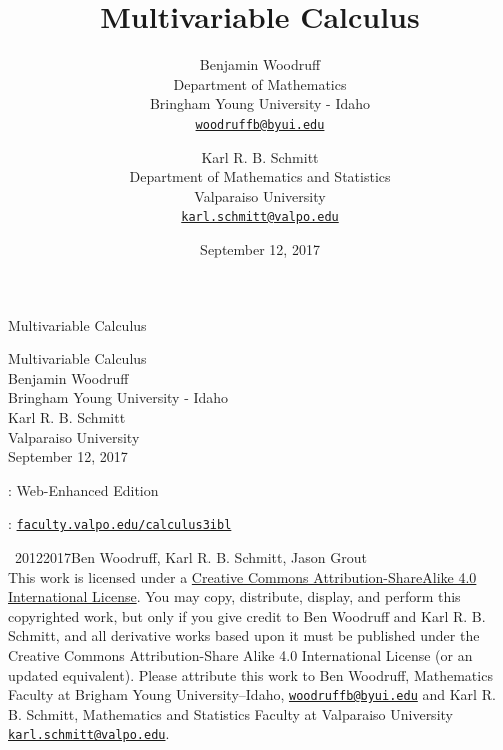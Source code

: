 \documentclass[10pt,]{book}
\title{Multivariable Calculus}
\author{Benjamin Woodruff\\
Department of Mathematics\\
Bringham Young University - Idaho\\
\href{mailto:woodruffb@byui.edu}{\nolinkurl{woodruffb@byui.edu}}
\and
Karl R. B. Schmitt\\
Department of Mathematics and Statistics \\
Valparaiso University\\
\href{mailto:karl.schmitt@valpo.edu}{\nolinkurl{karl.schmitt@valpo.edu}}
}
\date{September 12, 2017}
\theoremstyle{plain}
\theoremstyle{definition}
\theoremstyle{definition}
\theoremstyle{definition}
\theoremstyle{definition}
\theoremstyle{definition}
\numberwithin{equation}{section}
\begin{document}
\frontmatter
\thispagestyle{empty}
{\centering
\vspace*{0.28\textheight}
{\Huge Multivariable Calculus}\\}
\clearpage
\thispagestyle{empty}
\null%
\clearpage
\thispagestyle{empty}
{\centering
\vspace*{0.14\textheight}
{\Huge Multivariable Calculus}\\[3\baselineskip]
{\Large Benjamin Woodruff}\\[0.5\baselineskip]
{\Large Bringham Young University - Idaho}\\[3\baselineskip]
{\Large Karl R. B. Schmitt}\\[0.5\baselineskip]
{\Large Valparaiso University}\\[3\baselineskip]
{\Large September 12, 2017}\\}
\clearpage
\thispagestyle{empty}
: Web-Enhanced Edition\par\medskip
{}: \href{http://faculty.valpo.edu/calculus3ibl}{\lstinline?faculty.valpo.edu/calculus3ibl?}\par\medskip
\noindent\textcopyright\ 2012\textendash{}2017\quad{}Ben Woodruff, Karl R. B. Schmitt, Jason Grout\\[0.5\baselineskip]
 This work is licensed under a \href{http://creativecommons.org/licenses/by-sa/4.0/}{Creative Commons Attribution-ShareAlike 4.0 International License}. You may copy, distribute, display, and perform this copyrighted work, but only if you give credit to Ben Woodruff and Karl R. B. Schmitt, and all derivative works based upon it must be published under the Creative Commons Attribution-Share Alike 4.0 International License (or an updated equivalent). Please attribute this work to Ben Woodruff, Mathematics Faculty at Brigham Young University--Idaho, \href{mailto:woodruffb@byui.edu}{\nolinkurl{woodruffb@byui.edu}} and Karl R. B. Schmitt, Mathematics and Statistics Faculty at Valparaiso University \href{mailto:karl.schmitt@valpo.edu}{\nolinkurl{karl.schmitt@valpo.edu}}.\par\medskip
{}
\null\clearpage
\end{document}
